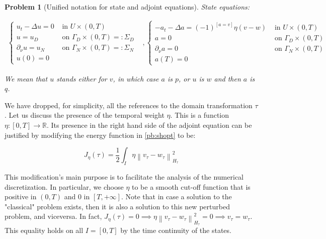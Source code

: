 \documentclass[english,a4paper,9pt,oneside]{scrbook}	%
\theoremstyle{break}
\newtheorem{pb}[equation]{Problem}
\theoremstyle{remark}
\newcommand{\mR}{\mathbb{R}}
\newcommand{\norm}[1]{\left\lVert#1\right\rVert}
\begin{document}
\begin{pb}[Unified notation for state and adjoint equations]
\label{pb:uni_state_adj}
State equations:

\[
\begin{matrix}
\left\{\begin{matrix}
u_t-\Delta u =0 & \text{ in } U\times (0,T)\\ 
u = u_D & \text{ on } \Gamma_D\times(0,T)=:\Sigma_D\\ 
\partial_\nu u = u_N & \text{ on } \Gamma_N\times(0,T)=:\Sigma_N\\ 
u(0) =0 & 
\end{matrix}\right.

&,

\left\{\begin{matrix}
-a_t-\Delta a =(-1)^{\left [a=v\right ]}\eta (v-w) & \text{ in } U\times (0,T)\\ 
a = 0 & \text{ on } \Gamma_D\times(0,T)\\ 
\partial_\nu a = 0 & \text{ on } \Gamma_N\times(0,T)\\ 
a(T) =0 & 
\end{matrix}\right.
\end{matrix}
\]

We mean that $u$ stands either for $v$, in which case $a$ is $p$, or $u$ is $w$ and then $a$ is $q$.


\end{pb}

We have dropped, for simplicity, all the references to the domain transformation $\tau$. Let us discuss the presence of the temporal weight $\eta$. This is a function $\eta: [0,T] \rightarrow \mR$.
Its presence in the right hand side of the adjoint equation can be justified by modifying the energy function in \cref{pb:shopt} to be:

$$J_\eta(\tau) = \frac{1}{2} \int_I \eta \norm{v_\tau - w_\tau}_{H_\tau}^2$$

This modification's main purpose is to facilitate the analysis of the numerical discretization. In particular, we choose $\eta$ to be a smooth cut-off function that is positive in $(0,T)$ and $0$ in $[T, +\infty]$. Note that in case a solution to the "classical" problem exists, then it is also a solution to this new  perturbed problem, and viceversa. In fact, $J_\eta(\tau)=0 \implies \eta \norm{v_\tau - w_\tau}_{H_\tau}^2=0 \implies v_\tau = w_\tau$. This equality holds on all $I=[0,T]$ by the time continuity of the states.
\end{document}
